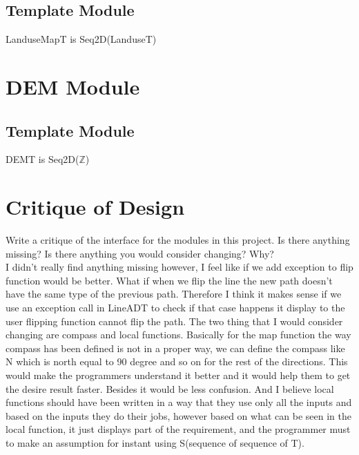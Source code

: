 \documentclass[12pt]{article}
\begin{document}
\subsection* {Template Module}

LanduseMapT is Seq2D(LanduseT)

\section* {DEM Module}

\subsection* {Template Module}

DEMT is Seq2D($\mathbb{Z}$)

\newpage

\section*{Critique of Design}

Write a critique of the interface for the modules in this project.  Is there
anything missing?  Is there anything you would consider changing?  Why? \\ I didn't really find anything missing however, I feel like if we add exception to flip function would be better. What if when we flip the line the new path doesn't have the same type of the previous path. Therefore I think it makes sense if we use an exception call in LineADT to check if that case happens it display to the user flipping function cannot flip the path. The two thing that I would consider changing are compass and local functions. Basically for the map function the way compass has been defined is not in a proper way, we can define the compass like N which is north equal to 90 degree and so on for the rest of the directions. This would make the programmers understand it better and it would help them to get the desire result faster. Besides it would be less confusion. And I believe local functions should have been written in a way that they use only all the inputs and based on the inputs they do their jobs, however based on what can be seen in the local function, it just displays part of the requirement, and the programmer must to make an assumption for instant using S(sequence of sequence of T).
\end{document}
